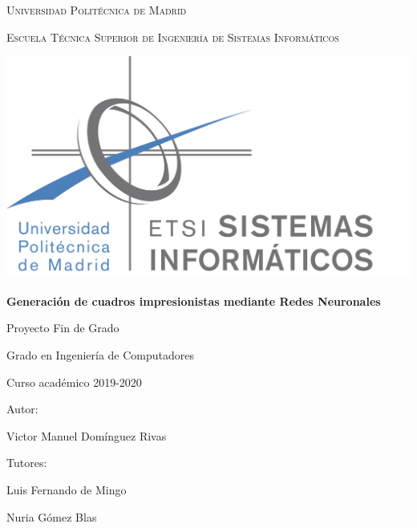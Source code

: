 \documentclass[a4paper]{report}
\newcommand\paginablanco{%
    \null
    \thispagestyle{empty}%
    \newpage}
\newcommand\paginablancosin{%
    \paginablanco{}
    \addtocounter{page}{-1}}
\begin{document}
\begin{titlepage}
\thispagestyle{empty}
\centering %
{\scshape\Large  Universidad Politécnica de Madrid \par}
{\scshape\Large Escuela Técnica Superior de Ingeniería de Sistemas Informáticos \par}
\vfill
{\includegraphics[width=1\textwidth]{logo_etsisi.png}\par}
\vfill
{\bfseries\LARGE Generación de cuadros impresionistas mediante Redes Neuronales \par}
\vfill
{\Large Proyecto Fin de Grado \par}
\vfill
{\Large Grado en Ingeniería de Computadores \par}
\vfill
{\Large Curso académico 2019-2020 \par}
\vfill
{\Large Autor: \par}
{\Large Victor Manuel Domínguez Rivas \par}
\vfill
{\Large Tutores: \par}
{\Large Luis Fernando de Mingo \par}
{\Large Nuria Gómez Blas \par}
\end{titlepage}

\paginablancosin{}


\end{document}
